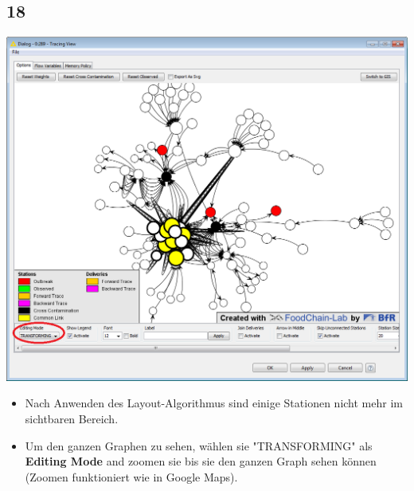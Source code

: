 \documentclass{beamer}
\begin{document}
\subsection{18}
\begin{frame}
	\begin{center}
  		\includegraphics[height=0.6\textheight]{18.png}
	\end{center}
	\begin{itemize}
		\item Nach Anwenden des Layout-Algorithmus sind einige Stationen nicht mehr im sichtbaren Bereich.
		\item Um den ganzen Graphen zu sehen, wählen sie "TRANSFORMING" als \textbf{Editing Mode} and zoomen sie bis sie den ganzen Graph sehen können (Zoomen funktioniert wie in Google Maps).
	\end{itemize}
\end{frame}
\end{document}
